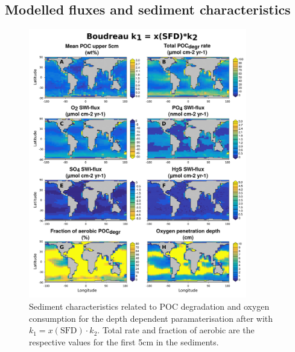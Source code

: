 \documentclass[gmd, manuscript]{copernicus}
\begin{document}
\subsection{Modelled fluxes and sediment characteristics}
\begin{figure}[htbp]
\begin{center}
	\includegraphics[width=0.85\textwidth]{figures/OMEN-GENIE-Exp/0_2908_Boudreau_Depth_SED_PROPS_AND_FLUXES_1009_LINES.pdf}
	\caption{Sediment characteristics related to POC degradation and oxygen consumption for the depth dependent paramaterisation after \citet{boudreau1997diagenetic} with $k_1 = x(\mathrm{SFD}) \cdot k_2$.
	Total  rate and fraction of aerobic  are the respective values for the first 5cm in the sediments. 
	}\label{fig:OMEN_GENIE_best_fit_invariant}
\end{center}
\end{figure}

\end{document}
